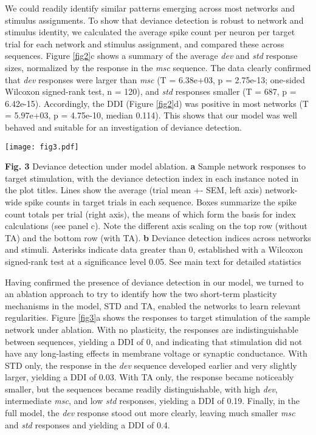 \documentclass[pdflatex,referee,iicol,sn-basic]{sn-jnl}
\newcommand{\dev}{\textit{dev}}
\newcommand{\msc}{\textit{msc}}
\newcommand{\std}{\textit{std}}
\theoremstyle{thmstyleone}%
\theoremstyle{thmstyletwo}%
\theoremstyle{thmstylethree}%
\begin{document}
We could readily identify similar patterns emerging across most networks and stimulus assignments. To show that deviance detection is robust to network and stimulus identity, we calculated the average spike count per neuron per target trial for each network and stimulus assignment, and compared these across sequences. Figure \ref{fig2}c shows a summary of the average \dev{} and \std{} response sizes, normalized by the response in the \msc{} sequence. The data clearly confirmed that \dev{} responses were larger than \msc{} (T = 6.38e+03, p = 2.75e-13; one-sided Wilcoxon signed-rank test, n = 120), and \std{} responses smaller (T = 687, p = 6.42e-15). Accordingly, the DDI (Figure \ref{fig2}d) was positive in most networks (T = 5.97e+03, p = 4.75e-10, median 0.114). This shows that our model was well behaved and suitable for an investigation of deviance detection.

\begin{figure*}%
    \centering
    \texttt{[image: fig3.pdf]}
    \caption{}
    \label{fig3}
\end{figure*}
\textbf{Fig. 3} Deviance detection under model ablation. \textbf{a} Sample network responses to target stimulation, with the deviance detection index in each instance noted in the plot titles. Lines show the average (trial mean +- SEM, left axis) network-wide spike counts in target trials in each sequence. Boxes summarize the spike count totals per trial (right axis), the means of which form the basis for index calculations (see panel c). Note the different axis scaling on the top row (without TA) and the bottom row (with TA). \textbf{b} Deviance detection indices across networks and stimuli. Asterisks indicate data greater than 0, established with a Wilcoxon signed-rank test at a significance level 0.05. See main text for detailed statistics

Having confirmed the presence of deviance detection in our model, we turned to an ablation approach to try to identify how the two short-term plasticity mechanisms in the model, STD and TA, enabled the networks to learn relevant regularities. Figure \ref{fig3}a shows the responses to target stimulation of the sample network under ablation. With no plasticity, the responses are indistinguishable between sequences, yielding a DDI of 0, and indicating that stimulation did not have any long-lasting effects in membrane voltage or synaptic conductance. With STD only, the response in the \dev{} sequence developed earlier and very slightly larger, yielding a DDI of 0.03. With TA only, the response became noticeably smaller, but the sequences became readily distinguishable, with high \dev{}, intermediate \msc{}, and low \std{} responses, yielding a DDI of 0.19. Finally, in the full model, the \dev{} response stood out more clearly, leaving much smaller \msc{} and \std{} responses and yielding a DDI of 0.4.
\end{document}
